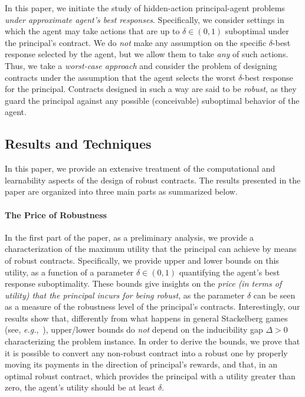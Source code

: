 In this paper, we initiate the study of hidden-action principal-agent problems \emph{under approximate agent's best responses}.
%
Specifically, we consider settings in which the agent may take actions that are up to $\delta \in (0,1)$ suboptimal under the principal's contract.
%
We do \emph{not} make any assumption on the specific $\delta$-best response selected by the agent, but we allow them to take \emph{any} of such actions.
%
Thus, we take a \emph{worst-case approach} and consider the problem of designing contracts under the assumption that the agent selects the worst $\delta$-best response for the principal.
%
Contracts designed in such a way are said to be \emph{robust}, as they guard the principal against any possible (conceivable) suboptimal behavior of the agent.

\subsection{Results and Techniques}

In this paper, we provide an extensive treatment of the computational and learnability aspects of the design of robust contracts.
%
The results presented in the paper are organized into three main parts as summarized below.


\paragraph{The Price of Robustness}
%
In the first part of the paper, as a preliminary analysis, we provide a characterization of the maximum utility that the principal can achieve by means of robust contracts. 
%
Specifically, we provide upper and lower bounds on this utility, as a function of a parameter $\delta \in (0,1)$ quantifying the agent's best response suboptimality.
%
These bounds give insights on the \emph{price (in terms of utility) that the principal incurs for being robust}, as the parameter $\delta$ can be seen as a measure of the robustness level of the principal's contracts.
%
Interestingly, our results show that, differently from what happens in general Stackelberg games (see, \emph{e.g.},~\citep{gan2024robust}), upper/lower bounds do \emph{not} depend on the inducibility gap $\Delta>0$ characterizing the problem instance.
%
In order to derive the bounds, we prove that it is possible to convert any non-robust contract into a robust one by properly moving its payments in the direction of principal’s rewards, and that, in an optimal robust contract, which provides the principal with a utility greater than zero, the agent’s utility should be at least $\delta$.




